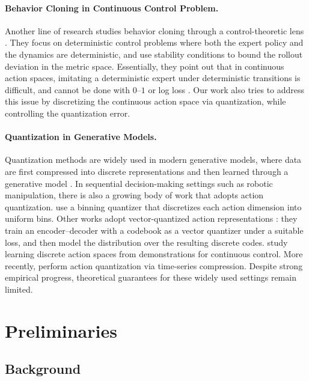 \documentclass{article}
\let\oldparagraph\paragraph
\renewcommand{\paragraph}[1]{\oldparagraph{#1.}}
\begin{document}
\paragraph{Behavior Cloning in Continuous Control Problem}
Another line of research studies behavior cloning through a control-theoretic lens \citep{chi2023diffusion,pfrommer2022tasil, block2023provable, simchowitz2025pitfalls, zhang2025imitation}. They focus on deterministic control problems where both the expert policy and the dynamics are deterministic, and use stability conditions to bound the rollout deviation in the metric space. Essentially, they point out that in continuous action spaces, imitating a deterministic expert under deterministic transitions is difficult, and cannot be done with $0$--$1$ or log loss \citep{simchowitz2025pitfalls}. Our work also tries to address this issue by discretizing the continuous action space via quantization, while controlling the quantization error.

\paragraph{Quantization in Generative Models}
Quantization methods are widely used in modern generative models, where data are first compressed into discrete representations and then learned through a generative model \citep{van2017neural,esser2021taming,tian2024visual}. In sequential decision-making settings such as robotic manipulation, there is also a growing body of work that adopts action quantization. \citet{brohan2022rt,brohan2024rt,kim2024openvla} use a binning quantizer that discretizes each action dimension into uniform bins. Other works adopt vector-quantized action representations \citep{lee2024behavior,belkhale2024minivla,mete2024quest}: they train an encoder--decoder with a codebook as a vector quantizer under a suitable loss, and then model the distribution over the resulting discrete codes. \citet{dadashi2021continuous} study learning discrete action spaces from demonstrations for continuous control. More recently, \citet{pertsch2025fast} perform action quantization via time-series compression. Despite strong empirical progress, theoretical guarantees for these widely used settings remain limited.


\section{Preliminaries}


\subsection{Background}
\end{document}
